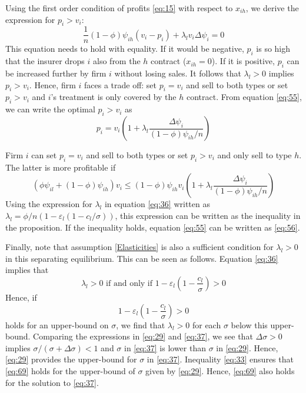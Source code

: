\documentclass[a4paper,12pt]{article}
\begin{document}
Using the first order condition of profits \eqref{eq:15} with respect to \(x_{ih}\), we derive the expression for \(p_i>v_i\):
\begin{equation}
\label{eq:55}
\frac{1}{n}(1-\phi)\psi_{ih}(v_i-p_i) + \lambda_l v_i \Delta \psi_i = 0
\end{equation}
This equation needs to hold with equality. If it would be negative, \(p_i\) is so high that the insurer drops \(i\) also from the \(h\) contract (\(x_{ih}=0\)). If it is positive, \(p_i\) can be increased further by firm \(i\) without losing sales. It follows that \(\lambda_l>0\) implies \(p_i>v_i\). Hence, firm \(i\) faces a trade off: set \(p_i=v_i\) and sell to both types or set \(p_i>v_i\) and \(i\)'s treatment is only covered by the \(h\) contract. From equation \eqref{eq:55}, we can write the optimal \(p_i>v_i\) as
\begin{equation}
\label{eq:60}
p_i = v_i \left( 1+ \lambda_l \frac{\Delta\psi_i}{(1-\phi)\psi_{ih}/n} \right)
\end{equation}

Firm \(i\) can set \(p_i = v_i\) and sell to both types or set \(p_i>v_i\) and only sell to type \(h\). The latter is more profitable if
\begin{equation}
\label{eq:3}
(\phi \psi_{il} + (1-\phi)\psi_{ih})v_i \leq (1-\phi)\psi_{ih} v_i \left( 1+\lambda_l \frac{\Delta \psi_i}{(1-\phi)\psi_{ih}/n} \right)
\end{equation}
Using the expression for \(\lambda_l\) in equation \eqref{eq:36} written as \(\lambda_l = \phi/n (1 - \varepsilon_l (1-c_{l}/\sigma))\), this expression can be written as the inequality in the proposition. If the inequality holds, equation \eqref{eq:55} can be written as \eqref{eq:56}.

Finally, note that assumption \ref{Elasticities} is also a sufficient condition for \(\lambda_l > 0\) in this separating equilibrium. This can be seen as follows. Equation \eqref{eq:36} implies that
\begin{equation}
\label{eq:68}
\lambda_l > 0 \text{ if and only if } 1-\varepsilon_l \left(1-\frac{c_l}{\sigma} \right) > 0
\end{equation}
Hence, if
\begin{equation}
\label{eq:69}
1-\varepsilon_l \left(1-\frac{c_l}{\sigma} \right) > 0
\end{equation}
holds for an upper-bound on \(\sigma\), we find that \(\lambda_l > 0\) for each \(\sigma\) below this upper-bound. Comparing the expressions in \eqref{eq:29} and \eqref{eq:37}, we see that \(\Delta \sigma > 0\) implies \(\sigma/(\sigma+\Delta\sigma)<1\) and \(\sigma\) in \eqref{eq:37} is lower than \(\sigma\) in \eqref{eq:29}. Hence, \eqref{eq:29} provides the upper-bound for \(\sigma\) in \eqref{eq:37}. Inequality \eqref{eq:33} ensures that \eqref{eq:69} holds for the upper-bound of \(\sigma\) given by \eqref{eq:29}. Hence, \eqref{eq:69} also holds for the solution to \eqref{eq:37}.
\end{document}
